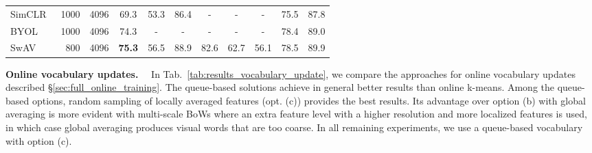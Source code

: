 \documentclass[final]{cvpr}
\newcommand{\parag}[1]{\smallskip\noindent\textbf{#1}~~}
\newcommand{\resnetfifty}{ResNet50\xspace}
\begin{document}
\begin{table*}[t!]
{{\begin{tabular}{ l | r | r | c c c | c c c | c c }
SimCLR~\cite{chen2020simple}                                     & 1000 & 4096 & 69.3 & 53.3 & 86.4 & -    & -    & -    & 75.5 & 87.8\\
BYOL~\cite{grill2020bootstrap}                                   & 1000 & 4096 & 74.3 &  -   &  -   & -    & -    & -    & 78.4 & 89.0\\
SwAV~\cite{caron2020unsupervised}                                &  800 & 4096 & \textbf{75.3} & 56.5 & 88.9 & 82.6 & 62.7 & 56.1 & 78.5 & 89.9\\
\bottomrule
\end{tabular}}}
\vspace{-7pt}
\caption{
\textbf{Evaluation of ImageNet pre-trained \resnetfifty models}.
The Epochs and Batch columns provide the number of pre-training epochs and the batch size of each model respectively.
The first section includes models pre-trained with a similar number of epochs as our model (second section). 
We boldfaced the best results among all sections as well as of only the top two.
For the linear classification tasks, we provide the top-1 accuracy.
For object detection, we fine-tuned Faster R-CNN (R50-C4) on VOC \texttt{trainval07+12} and report detection AP scores by testing on \texttt{test07}.
For semi-supervised learning, we fine-tune the pre-trained models on  and  of ImageNet and report the top-5 accuracy.
Note that, in this case the ``Supervised'' entry results are obtained by supervised training of a classification model from scratch only using  or  of the labelled data.
All the classification results are computed with single-crop testing.
}
\vspace{-8pt}
\label{tab:full_imagenet}
\end{table*}


\parag{Online vocabulary updates.}
In Tab.~\ref{tab:results_vocabulary_update}, we compare the approaches for online 
vocabulary updates described \S\ref{sec:full_online_training}.
The queue-based solutions achieve in general better results than online k-means. 
Among the queue-based options,
random sampling of locally averaged features (opt. (c)) provides the best results. 
Its advantage over option (b) with global averaging is more evident with multi-scale BoWs where an extra feature level with a higher resolution and more localized features is used,
in which case global averaging produces visual words that are too coarse.
In all remaining experiments, we use a queue-based vocabulary with option (c).
\end{document}

